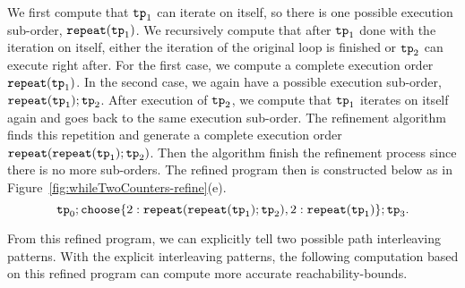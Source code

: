 We first compute that $\mathtt{tp}_1$ can iterate on itself, so there is one possible execution sub-order,
$\mathtt{repeat}(\mathtt{tp}_1)$.
We recursively compute that after $\mathtt{tp}_1$ done with the iteration on itself,
either the iteration of the original loop is finished
or $\mathtt{tp}_2$ can execute right after.
For the first case, we compute a complete execution order $\mathtt{repeat}(\mathtt{tp}_1)$.
In the second case, we again have a possible execution sub-order, $\mathtt{repeat}(\mathtt{tp}_1); \mathtt{tp}_2$.
After execution of $\mathtt{tp}_2$, we compute that $\mathtt{tp}_1$ iterates on itself again
and goes back to the same execution sub-order. 
The refinement algorithm finds this repetition and generate a complete execution order
$\mathtt{repeat}(\mathtt{repeat}(\mathtt{tp}_1); \mathtt{tp}_2)$.
Then the algorithm finish the refinement process since there is no more sub-orders. 
The refined program then is constructed below as in Figure~\ref{fig:whileTwoCounters-refine}(e).
\[
   \tpath_0 ; 
   \rpchoose{2: \rprepeat(\rprepeat(\tpath_1); \tpath_2), 
   2: \rprepeat(\tpath_1)}; \tpath_3.
\]

From this refined program, we can explicitly tell two possible path interleaving patterns.
With the explicit interleaving patterns, the following computation based on this refined program can compute more accurate reachability-bounds.
